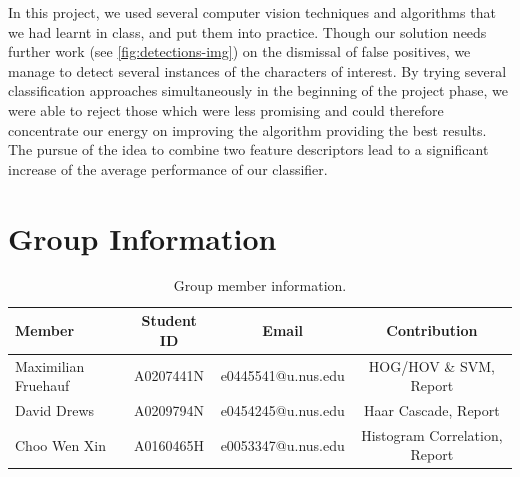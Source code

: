 \documentclass[11pt]{article}
\begin{document}
In this project, we used several computer vision techniques and algorithms that we had
learnt in class, and put them into practice. Though our solution needs further work (see \autoref{fig:detections-img}) on the dismissal of
false positives, we manage to detect several instances of the characters of interest. By trying several
classification approaches simultaneously in the beginning of the project phase, we were able to reject those
which were less promising and could therefore concentrate our energy on improving the algorithm providing
the best results. The pursue of the idea to combine two feature descriptors lead to a significant increase
of the average performance of our classifier.

\pagebreak

\section{Group Information}

\begin{table}[ht]
    \centering
    \begin{tabular}{lccc}
    \toprule
     Member & Student ID & Email & Contribution\\
    \midrule
    Maximilian Fruehauf& A0207441N & e0445541@u.nus.edu & HOG/HOV \& SVM, Report \\
    David Drews & A0209794N & e0454245@u.nus.edu & Haar Cascade, Report \\
    Choo Wen Xin& A0160465H & e0053347@u.nus.edu & Histogram Correlation, Report \\
    \bottomrule
    \end{tabular}
    \caption{Group member information.}
    \label{tab:dataset}
\end{table}





\end{document}
